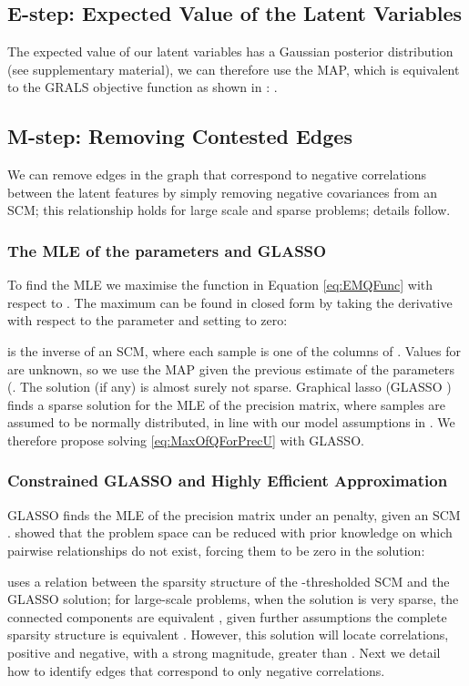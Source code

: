 \documentclass{article}
\theoremstyle{plain}
\theoremstyle{definition}
\theoremstyle{remark}
\begin{document}
\subsection{E-step: Expected Value of the Latent Variables} \label{sec:EStepFullU} The expected value of our latent variables has a Gaussian posterior distribution (see supplementary material), we can therefore use the MAP, which is equivalent to the GRALS objective function as shown in : .

\subsection{M-step: Removing Contested Edges}\label{sec:Mstep}

We can remove edges in the graph that correspond to negative correlations between the latent features by simply removing negative covariances from an SCM; this relationship holds for large scale and sparse problems; details follow.
\subsubsection{The MLE of the parameters and GLASSO} To find the MLE we maximise the  function in Equation \eqref{eq:EMQFunc} with respect to . The maximum can be found in closed form by taking the derivative with respect to the parameter  and setting to zero:

 is the inverse of an SCM, where each sample is one of the columns of . Values for  are unknown, so we use the MAP given the previous estimate of the parameters (.  The solution (if any) is almost surely not sparse. Graphical lasso (GLASSO \cite{mazumder2012graphical}) finds a sparse solution for the MLE of the precision matrix, where samples are assumed to be normally distributed, in line with our model assumptions in . We therefore propose solving \eqref{eq:MaxOfQForPrecU} with GLASSO. 

\subsubsection{Constrained GLASSO and Highly Efficient Approximation} GLASSO finds the MLE of the precision matrix under an  penalty, given an SCM . \citet{grechkin2015pathway} showed that the problem space can be reduced with prior knowledge on which pairwise relationships do not exist, forcing them to be zero in the solution:

\citet{zhang2018largescaleprec} uses a relation between the sparsity structure of the -thresholded SCM and the GLASSO solution;  for large-scale problems, when the solution is very sparse, the connected components are equivalent \cite{mazumder2012graphical}, given further assumptions the complete sparsity structure is equivalent \cite{fattahi2019graphical,sojoudi2016equivalence,sojoudi2016graphical}. 
However, this solution will locate correlations, positive and negative, with a strong magnitude, greater than . Next we detail how to identify edges that correspond to only negative correlations.
\end{document}
